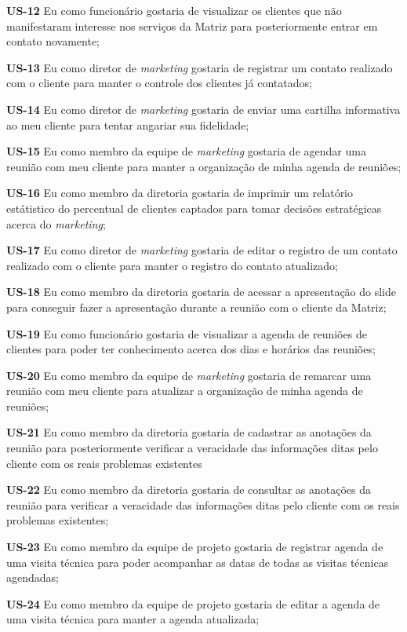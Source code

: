 \textbf{US-12} Eu como funcionário gostaria de visualizar os clientes que não manifestaram interesse nos serviços da Matriz para posteriormente entrar em contato novamente;


\textbf{US-13} Eu como diretor de \textit{marketing} gostaria de registrar um contato realizado com o cliente para manter o controle dos clientes já contatados;


\textbf{US-14} Eu como diretor de \textit{marketing} gostaria de enviar uma cartilha informativa ao meu cliente para tentar angariar sua fidelidade;


\textbf{US-15} Eu como membro da equipe de \textit{marketing} gostaria de agendar uma reunião com meu cliente para manter a organização de minha agenda de reuniões;


\textbf{US-16} Eu como membro da diretoria gostaria de imprimir um relatório estátistico do percentual de clientes captados para tomar decisões estratégicas acerca do \textit{marketing};


\textbf{US-17} Eu como diretor de \textit{marketing} gostaria de editar o registro de um contato realizado com o cliente para manter o registro do contato atualizado;


\textbf{US-18} Eu como membro da diretoria gostaria de acessar a apresentação do slide para conseguir fazer a apresentação durante a reunião com o cliente da Matriz;


\textbf{US-19} Eu como funcionário gostaria de visualizar a agenda de reuniões de clientes para poder ter conhecimento acerca dos dias e horários das reuniões;


\textbf{US-20} Eu como membro da equipe de \textit{marketing} gostaria de remarcar uma reunião com meu cliente para atualizar a organização de minha agenda de reuniões;


\textbf{US-21} Eu como membro da diretoria gostaria de cadastrar as anotações da reunião para posteriormente verificar a veracidade das informações ditas pelo cliente com os reais problemas existentes


\textbf{US-22} Eu como membro da diretoria gostaria de consultar as anotações da reunião para verificar a veracidade das informações ditas pelo cliente com os reais problemas existentes;


\textbf{US-23} Eu como membro da equipe de projeto gostaria de registrar agenda de uma visita técnica para poder acompanhar as datas de todas as visitas técnicas agendadas;


\textbf{US-24} Eu como membro da equipe de projeto gostaria de editar a agenda de uma visita técnica para manter a agenda atualizada;


